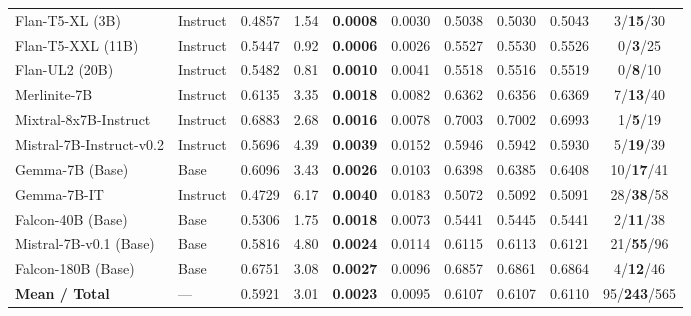 \begin{table}[!ht]
\begin{tabular*}{\textwidth}{@{\extracolsep{\fill}}llcccccccc@{}}
Flan-T5-XL (3B) & Instruct & 0.4857 & 1.54 & \textbf{0.0008} & 0.0030 & 0.5038 & 0.5030 & 0.5043 & 3/\textbf{15}/30 \\
Flan-T5-XXL (11B) & Instruct & 0.5447 & 0.92 & \textbf{0.0006} & 0.0026 & 0.5527 & 0.5530 & 0.5526 & 0/\textbf{3}/25 \\
Flan-UL2 (20B) & Instruct & 0.5482 & 0.81 & \textbf{0.0010} & 0.0041 & 0.5518 & 0.5516 & 0.5519 & 0/\textbf{8}/10 \\
Merlinite-7B & Instruct & 0.6135 & 3.35 & \textbf{0.0018} & 0.0082 & 0.6362 & 0.6356 & 0.6369 & 7/\textbf{13}/40 \\
Mixtral-8x7B-Instruct & Instruct & 0.6883 & 2.68 & \textbf{0.0016} & 0.0078 & 0.7003 & 0.7002 & 0.6993 & 1/\textbf{5}/19 \\
Mistral-7B-Instruct-v0.2 & Instruct & 0.5696 & 4.39 & \textbf{0.0039} & 0.0152 & 0.5946 & 0.5942 & 0.5930 & 5/\textbf{19}/39 \\
Gemma-7B (Base) & Base & 0.6096 & 3.43 & \textbf{0.0026} & 0.0103 & 0.6398 & 0.6385 & 0.6408 & 10/\textbf{17}/41 \\
Gemma-7B-IT & Instruct & 0.4729 & 6.17 & \textbf{0.0040} & 0.0183 & 0.5072 & 0.5092 & 0.5091 & 28/\textbf{38}/58 \\
Falcon-40B (Base) & Base & 0.5306 & 1.75 & \textbf{0.0018} & 0.0073 & 0.5441 & 0.5445 & 0.5441 & 2/\textbf{11}/38 \\
Mistral-7B-v0.1 (Base) & Base & 0.5816 & 4.80 & \textbf{0.0024} & 0.0114 & 0.6115 & 0.6113 & 0.6121 & 21/\textbf{55}/96 \\
Falcon-180B (Base) & Base & 0.6751 & 3.08 & \textbf{0.0027} & 0.0096 & 0.6857 & 0.6861 & 0.6864 & 4/\textbf{12}/46 \\
\midrule
\textbf{Mean / Total} & --- & 0.5921 & 3.01 & \textbf{0.0023} & 0.0095 & 0.6107 & 0.6107 & 0.6110 & 95/\textbf{243}/565 \\
\bottomrule
\end{tabular*}
\end{table}
